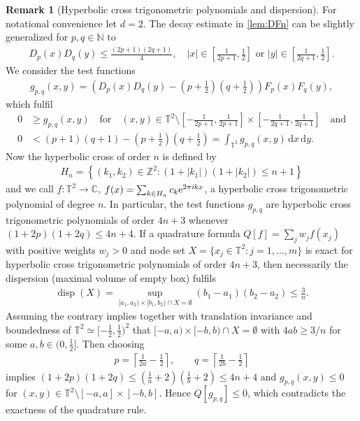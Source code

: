 \documentclass[11pt,a4paper,twoside,final,biblatex]{scrartcl}
\newcommand{\N}{\ensuremath{\mathbb{N}}}
\newcommand{\T}{\ensuremath{\mathbb{T}}}
\newcommand{\Z}{\ensuremath{\mathbb{Z}}}
\newcommand{\C}{\ensuremath{\mathbb{C}}}
\newcommand{\ii}{\mathit{i}}
\newcommand{\eip}[1]{\textnormal{e}^{2\pi\ii{#1}}}
\renewcommand{\d}{\,\mathrm{d}}
\newcommand{\disp}{\operatorname{disp}}
\theoremstyle{definition}
\newtheorem{remark}[theorem]{Remark}
\numberwithin{equation}{section}
\numberwithin{table}{section}
\numberwithin{figure}{section}
\begin{document}
\begin{remark}[Hyperbolic cross trigonometric polynomials and dispersion]
 For notational convenience let $d=2$. The decay estimate in \cref{lem:DFn} can be slightly generalized for $p,q\in\N$ to
 \begin{align*}
   D_p(x) D_q(y)\le \frac{(2p+1)(2q+1)}{4},\quad |x|\in \left[\frac{1}{2p+1},\frac12\right] \text{ or } |y|\in \left[\frac{1}{2q+1},\frac12\right].
 \end{align*}
 We consider the test functions
 \begin{align*}
     g_{p,q}(x,y)=\left(D_p(x) D_q(y) - \left(p+\frac12\right)\left(q+\frac12\right)\right)F_p(x)F_q(y),
 \end{align*}
 which fulfil
 \begin{align*}
  0&\ge g_{p,q}(x,y)\quad \text{for}\quad (x,y)\in \T^2\setminus
  \left[-\frac{1}{2p+1},\frac{1}{2p+1}\right]\times \left[-\frac{1}{2q+1},\frac{1}{2q+1}\right]  \quad \text{and}\\
  0&<(p+1)(q+1)-\left(p+\frac12\right)\left(q+\frac12\right) = \int_{\T^2} g_{p,q}(x,y) \d x \d y.
 \end{align*}
 Now the hyperbolic cross of order $n$ is defined by
 \begin{align*}
     H_n=\left\{(k_1,k_2)\in\Z^2:(1+|k_1|)(1+|k_2|) \le n+1\right\}
 \end{align*}
 and we call $f\colon\T^2\to\C$, $f(x)=\sum_{k\in H_n} c_k \eip{kx}$,
 a hyperbolic cross trigonometric polynomial of degree $n$. In particular, the test functions $g_{p,q}$ are hyperbolic cross trigonometric polynomials of order $4n+3$ whenever $(1+2p)(1+2q)\le 4n+4$.
 If a quadrature formula $Q[f]=\sum_j w_j f(x_j)$ with positive weights $w_j>0$ and node set $X=\{x_j\in\T^2:j=1,\hdots,m\}$ is exact for hyperbolic cross trigonometric polynomials of order $4n+3$, then necessarily the dispersion (maximal volume of empty box) fulfils
 \begin{align*}
     \disp(X)=\sup_{[a_1,a_2)\times[b_1,b_2)\cap X=\emptyset} (b_1-a_1)(b_2-a_2) \le \frac{3}{n}.
 \end{align*}
 Assuming the contrary implies together with translation invariance and boundedness of $\T^2\simeq [-\frac12,\frac12)^2$ that $[-a,a)\times[-b,b)\cap X=\emptyset$ with $4ab\ge 3/n$ for some $a,b\in(0,\frac{1}{2}]$. Then choosing
 \begin{align*}
     p=\left\lceil\frac{1}{2a}-\frac12\right\rceil,\qquad
     q=\left\lceil\frac{1}{2b}-\frac12\right\rceil
 \end{align*}
 implies
 $%
  (1+2p)(1+2q)\le \left(\frac{1}{a}+2\right)\left(\frac{1}{b}+2\right)\le 4n+4
 $ %
 and $g_{p,q}(x,y)\le 0$ for $(x,y)\in\T^2\setminus[-a,a]\times[-b,b]$. Hence $Q[g_{p,q}]\le 0$, which contradicts the exactness of the quadrature rule.
\end{remark}
\end{document}
